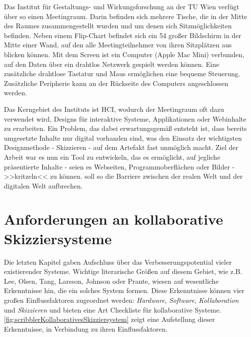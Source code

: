 \medskip Das Institut für Gestaltungs- und Wirkungsforschung an der TU Wien verfügt über so einen Meetingraum. Darin befinden sich mehrere Tische, die in der Mitte des Raumes zusammengestellt wurden und um denen sich Sitzmöglichkeiten befinden. Neben einem Flip-Chart befindet sich ein {54\dq} großer Bildschirm in der Mitte einer Wand, auf den alle Meetingteilnehmer von ihren Sitzplätzen aus blicken können. Mit dem Screen ist ein Computer (Apple Mac Mini) verbunden, auf den Daten über ein drahtlos Netzwerk gespielt werden können. Eine zusätzliche drahtlose Tastatur und Maus ermöglichen eine bequeme Steuerung. Zusätzliche Peripherie kann an der Rückseite des Computers angeschlossen werden.

\medskip Das Kerngebiet des Instituts ist \ac{HCI}, wodurch der Meetingraum oft dazu verwendet wird, Designs für interaktive Systeme, Applikationen oder Webinhalte zu erarbeiten. Ein Problem, das dabei erwartungsgemäß entsteht ist, dass bereits umgesetzte Inhalte nur digital vorhanden sind, was den Einsatz der wichtigsten Designmethode - Skizzieren - auf dem Artefakt fast unmöglich macht. Ziel der Arbeit war es nun ein Tool zu entwickeln, das es ermöglicht, auf jegliche präsentierte Inhalte - seien es Webseiten, Programmoberflächen oder Bilder - >>kritzeln<< zu können. \scribbler soll so die Barriere zwischen der realen Welt und der digitalen Welt aufbrechen.

\section{Anforderungen an kollaborative Skizziersysteme} \label{sec:anforderungen}
Die letzten Kapitel gaben Aufschluss über das Verbesserungspotential vieler existierender Systeme. Wichtige literarische Größen auf diesem Gebiet, wie z.B. Lee, Olsen, Tang, Larsson, Johnson oder Prante, wiesen auf wesentliche Erkenntnisse hin, die ein solches System formen. Diese Erkenntnisse können vier großen Einflussfaktoren zugeordnet werden: \emph{Hardware}, \emph{Software}, \emph{Kollaboration} und \emph{Skizzieren} und bieten eine Art Checkliste für kollaborative Systeme. \autoref{fig:scribblerKollaborativesSkizziersystem} zeigt eine Aufstellung dieser Erkenntnisse, in Verbindung zu ihren Einflussfaktoren. 

